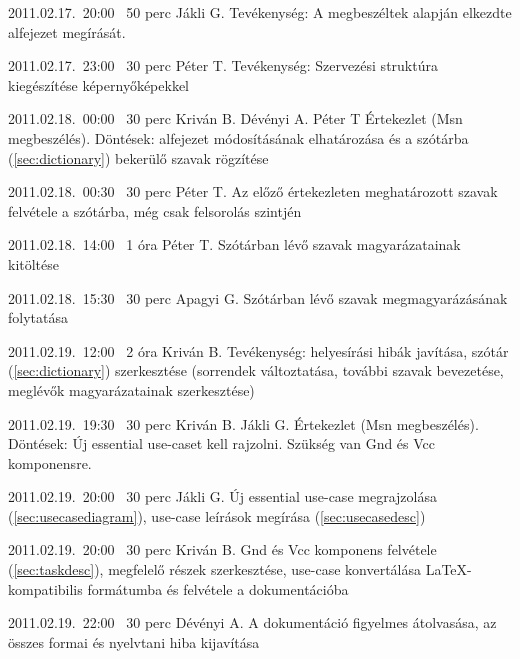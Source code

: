 \begin{naplo}
\bejegyzes
{2011.02.17.~20:00~}
{50 perc}
{Jákli G.}
{Tevékenység: A megbeszéltek alapján el\-kezdte  alfejezet megírását.}

\bejegyzes
{2011.02.17.~23:00~}
{30 perc}
{Péter T.}
{Tevékenység: Szervezési struktúra kiegészí\-tése képernyőképekkel}

\bejegyzes
{2011.02.18.~00:00~}
{30 perc}
{Kriván B.\newline
Dévényi A.\newline
Péter T}
{Értekezlet (Msn megbeszélés).\newline
Döntések:  alfejezet módosításának elhatározása és a szótárba (\ref{sec:dictionary}) bekerülő szavak rögzítése}

\bejegyzes
{2011.02.18.~00:30~}
{30 perc}
{Péter T.}
{Az előző értekezleten meghatározott szavak felvétele a szótárba, még csak felsorolás szint\-jén}

\bejegyzes
{2011.02.18.~14:00~}
{1 óra}
{Péter T.}
{Szótárban lévő szavak magyarázatainak kitöl\-tése}

\bejegyzes
{2011.02.18.~15:30~}
{30 perc}
{Apagyi G.}
{Szótárban lévő szavak megmagyarázásának folytatása}

\bejegyzes
{2011.02.19.~12:00~}
{2 óra}
{Kriván B.}
{Tevékenység: helyesírási hibák javítása, szó\-tár (\ref{sec:dictionary}) szerkesztése (sorrendek változtatása, további szavak bevezetése, meglévők magya\-rázatainak szerkesztése)}

\bejegyzes
{2011.02.19.~19:30~}
{30 perc}
{Kriván B.\newline
Jákli G.}
{Értekezlet (Msn megbeszélés).\newline
Döntések: Új essential use-caset kell rajzolni. Szükség van Gnd és Vcc komponensre.}

\bejegyzes
{2011.02.19.~20:00~}
{30 perc}
{Jákli G.}
{Új essential use-case megrajzolása (\ref{sec:usecasediagram}), use-case leírások megírása (\ref{sec:usecasedesc})}

\bejegyzes
{2011.02.19.~20:00~}
{30 perc}
{Kriván B.}
{Gnd és Vcc komponens felvétele (\ref{sec:taskdesc}), megfelelő részek szerkesztése, use-case konvertálása \LaTeX{}-kompatibilis formátumba és felvétele a dokumentációba}

\bejegyzes
{2011.02.19.~22:00~}
{30 perc}
{Dévényi A.}
{A dokumentáció figyelmes átolvasása, az összes formai és nyelvtani hiba kijavítása}

\end{naplo}

